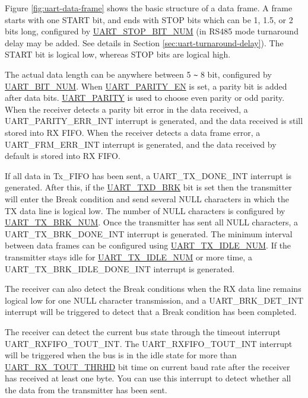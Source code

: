 \documentclass[main\_\_EN.tex]{subfiles}
\begin{document}
Figure \ref{fig:uart-data-frame} shows the basic structure of a data frame. A frame starts with one START bit, and ends with STOP bits which can be 1, 1.5, or 2 bits long, configured by \hyperref[fielddesc:UARTSTOPBITNUM]{UART\_STOP\_BIT\_NUM} (in RS485 mode turnaround delay may be added. See details in Section \ref{sec:uart-turnaround-delay}). The START bit is logical low, whereas STOP bits are logical high.

The actual data length can be anywhere between 5 \verb+~+ 8 bit, configured by \hyperref[fielddesc:UARTBITNUM]{UART\_BIT\_NUM}. When \hyperref[fielddesc:UARTPARITYEN]{UART\_PARITY\_EN} is set, a parity bit is added after data bits. \hyperref[fielddesc:UARTPARITY]{UART\_PARITY} is used to choose even parity or odd parity. When the receiver detects a parity bit error in the data received, a UART\_PARITY\_ERR\_INT interrupt is generated, and the data received is still stored into RX FIFO. When the receiver detects a data frame error, a UART\_FRM\_ERR\_INT interrupt is generated, and the data received by default is stored into RX FIFO.

If all data in Tx\_FIFO has been sent, a UART\_TX\_DONE\_INT interrupt is generated. After this, if the \hyperref[fielddesc:UARTTXDBRK]{UART\_TXD\_BRK} bit is set then the transmitter will enter the Break condition and send several NULL characters in which the TX data line is logical low. The number of NULL characters is configured by \hyperref[fielddesc:UARTTXBRKNUM]{UART\_TX\_BRK\_NUM}. Once the transmitter has sent all NULL characters, a UART\_TX\_BRK\_DONE\_INT interrupt is generated. The minimum interval between data frames can be configured using \hyperref[fielddesc:UARTTXIDLENUM]{UART\_TX\_IDLE\_NUM}. If the transmitter stays idle for \hyperref[fielddesc:UARTTXIDLENUM]{UART\_TX\_IDLE\_NUM} or more time, a UART\_TX\_BRK\_IDLE\_DONE\_INT interrupt is generated.

The receiver can also detect the Break conditions when the RX data line remains logical low for one NULL character transmission, and a UART\_BRK\_DET\_INT interrupt will be triggered to detect that a Break condition has been completed.

The receiver can detect the current bus state through the timeout interrupt UART\_RXFIFO\_TOUT\_INT. The UART\_RXFIFO\_TOUT\_INT interrupt will be triggered when the bus is in the idle state for more than \hyperref[fielddesc:UARTRXTOUTTHRHD]{UART\_RX\_TOUT\_THRHD} bit time on current baud rate after the receiver has received at least one byte. You can use this interrupt to detect whether all the data from the transmitter has been sent.
\end{document}
